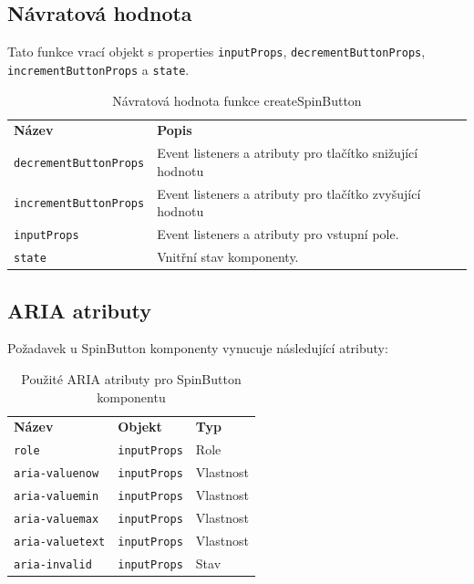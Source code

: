 \subsection{Návratová hodnota}

Tato funkce vrací objekt s properties \texttt{inputProps}, \texttt{decrementButtonProps}, \texttt{incrementButtonProps} a \texttt{state}.

\begin{table}[ht]\label{table:spinbutton-return}
    \begin{ctucolortab}
        \begin{tabularx}{\textwidth}{p{5cm} X}
            \bfseries Název               & \bfseries Popis                                           \\\Midrule{}
            \texttt{decrementButtonProps} & Event listeners a atributy pro tlačítko snižující hodnotu \\
            \texttt{incrementButtonProps} & Event listeners a atributy pro tlačítko zvyšující hodnotu \\
            \texttt{inputProps}           & Event listeners a atributy pro vstupní pole.              \\
            \texttt{state}                & Vnitřní stav komponenty.
        \end{tabularx}
    \end{ctucolortab}
    \caption{Návratová hodnota funkce createSpinButton}
\end{table}

\clearpage

\subsection{ARIA atributy}

Požadavek \hyperref[ofr12]{} u SpinButton komponenty vynucuje následující atributy:

\begin{table}[ht]
    \begin{ctucolortab}
        \begin{tabularx}{\textwidth}{X X X}
            \bfseries Název         & \bfseries Objekt    & \bfseries Typ \\\Midrule{}
            \texttt{role}           & \texttt{inputProps} & Role          \\
            \texttt{aria-valuenow}  & \texttt{inputProps} & Vlastnost     \\
            \texttt{aria-valuemin}  & \texttt{inputProps} & Vlastnost     \\
            \texttt{aria-valuemax}  & \texttt{inputProps} & Vlastnost     \\
            \texttt{aria-valuetext} & \texttt{inputProps} & Vlastnost     \\
            \texttt{aria-invalid}   & \texttt{inputProps} & Stav
        \end{tabularx}
    \end{ctucolortab}
    \caption{Použité ARIA atributy pro SpinButton komponentu}
    \label{table:spinbutton-aria}
\end{table}

